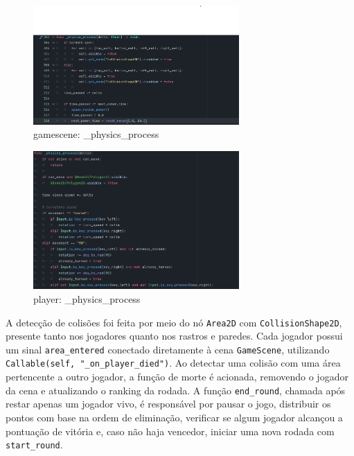 \begin{figure}[htbp]
    \centering
    \caption{gamescene: \_physics\_process}
    \label{fig:player_pp}
    \includegraphics[width=0.7\textwidth]{figuras/game_process.png}
\end{figure}

\begin{figure}[htbp]
    \centering
    \caption{player: \_physics\_process}
    \label{fig:gamascene_pp}
    \includegraphics[width=0.7\textwidth]{figuras/player_process.png}
\end{figure}

A detecção de colisões foi feita por meio do nó \texttt{Area2D} com \texttt{CollisionShape2D}, presente tanto nos jogadores quanto nos rastros e paredes. Cada jogador possui um sinal \texttt{area\_entered} conectado diretamente à cena \texttt{GameScene}, utilizando \texttt{Callable(self, "\_on\_player\_died")}. Ao detectar uma colisão com uma área pertencente a outro jogador, a função de morte é acionada, removendo o jogador da cena e atualizando o ranking da rodada. A função \texttt{end\_round}, chamada após restar apenas um jogador vivo, é responsável por pausar o jogo, distribuir os pontos com base na ordem de eliminação, verificar se algum jogador alcançou a pontuação de vitória e, caso não haja vencedor, iniciar uma nova rodada com \texttt{start\_round}.

